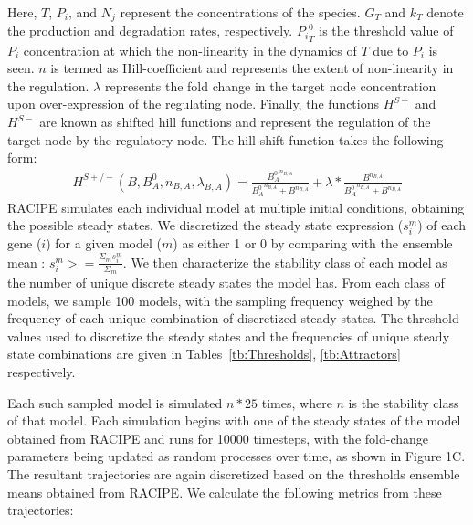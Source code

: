 \documentclass[11pt]{article}
\begin{document}
Here, $T$, $P_i$, and $N_j$ represent the concentrations of the species. $G_T$ and $k_T$ denote the production and degradation rates, respectively. ${P_i}^{0}_{T}$ is the threshold value of $P_i$ concentration at which the non-linearity in the dynamics of $T$ due to $P_i$ is seen. $n$ is termed as Hill-coefficient and represents the extent of non-linearity in the regulation. $\lambda$ represents the fold change in the target node concentration upon over-expression of the regulating node. Finally, the functions $H^{S+}$ and $H^{S-}$ are known as shifted hill functions and represent the regulation of the target node by the regulatory node. The hill shift function takes the following form:
\begin{equation}
    \begin{split}
        H^{S+/-}(B, B^0_A, n_{B,A}, \lambda_{B,A}) = 
     \frac{{B^0_A}^{n_{B,A}}}{{B^0_A}^{n_{B,A}} + B^{n_{B,A}}} + \lambda * \frac{B^{n_{B,A}}}{{B^0_A}^{n_{B,A}} + B^{n_{B,A}}}
    \end{split}
\end{equation}
RACIPE simulates each individual model at multiple initial conditions, obtaining the possible steady states. We discretized the steady state expression ($s_i^m$) of each gene ($i$) for a given model ($m$) as either 1 or 0 by comparing with the ensemble mean : $s_i^m >= \frac{\Sigma_ms_i^m}{\Sigma_m}$. We then characterize the stability class of each model as the number of unique discrete steady states the model has. From each class of models, we sample 100 models, with the sampling frequency weighed by the frequency of each unique combination of discretized steady states. The threshold values used to discretize the steady states and the frequencies of unique steady state combinations are given in Tables~\ref{tb:Thresholds}, \ref{tb:Attractors} respectively. 

Each such sampled model is simulated $n*25$ times, where $n$ is the stability class of that model. Each simulation begins with one of the steady states of the model obtained from RACIPE and runs for 10000 timesteps, with the fold-change parameters being updated as random processes over time, as shown in Figure 1C. The resultant trajectories are again discretized based on the thresholds ensemble means obtained from RACIPE. We calculate the following metrics from these trajectories:
\end{document}
